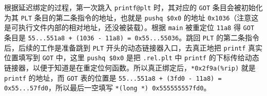 \begin{problems}
        根据延迟绑定的过程，第一次跳入 \verb|printf@plt| 时，其对应的 \verb|GOT| 条目会被初始化为其 \verb|PLT| 条目的第二条指令的地址，也就是 \verb|pushq $0x0| 的地址 \verb|0x1036|（注意这是可执行文件内部的相对地址，还没被装载）。根据 \verb|main| 被重定位 \verb|11a8| 得 \verb|GOT| 条目是 \verb|55...551a8 + (1036 - 11a8) = 0x55...55036|。跳回 \verb|PLT| 的第二条指令后，后续的工作是准备跳到 \verb|PLT| 开头的动态链接器入口，去真正地把 \verb|printf| 真实位置填写到 \verb|GOT| 中，这里 \verb|pushq $0x0| 是把 \verb|.rel.plt| 中 \verb|printf| 的下标传给动态链接器，以便于知道是在重定位何函数。所以真正绑定后，\verb|*0x2f9a(%rip)| 就是 \verb|printf| 的地址，而 \verb|GOT| 表的位置是 \verb|55...551a8 + (3fd0 - 11a8) = 0x55...57fd0|，所以最后一空填写 \verb|*(long *) 0x555555557fd0|。
    \end{problems}

